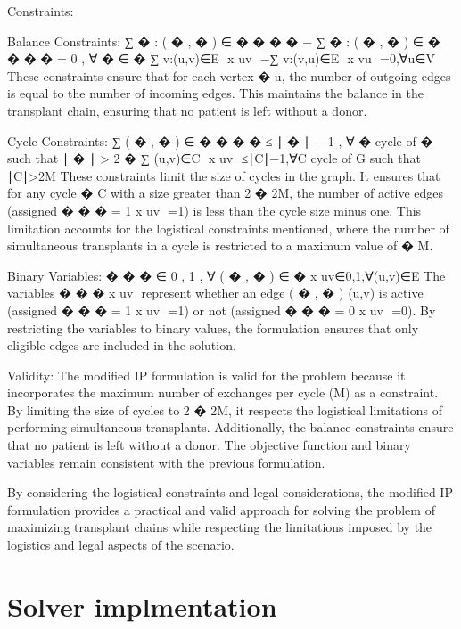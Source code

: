 \documentclass{ULBreport}
\begin{document}
Constraints:

Balance Constraints:
∑
�
:
(
�
,
�
)
∈
�
�
�
�
−
∑
�
:
(
�
,
�
)
∈
�
�
�
�
=
0
,
∀
�
∈
�
∑ 
v:(u,v)∈E
​
 x 
uv
​
 −∑ 
v:(v,u)∈E
​
 x 
vu
​
 =0,∀u∈V
These constraints ensure that for each vertex 
�
u, the number of outgoing edges is equal to the number of incoming edges. This maintains the balance in the transplant chain, ensuring that no patient is left without a donor.

Cycle Constraints:
∑
(
�
,
�
)
∈
�
�
�
�
≤
∣
�
∣
−
1
,
∀
�
 cycle of 
�
 such that 
∣
�
∣
>
2
�
∑ 
(u,v)∈C
​
 x 
uv
​
 ≤∣C∣−1,∀C cycle of G such that ∣C∣>2M
These constraints limit the size of cycles in the graph. It ensures that for any cycle 
�
C with a size greater than 
2
�
2M, the number of active edges (assigned 
�
�
�
=
1
x 
uv
​
 =1) is less than the cycle size minus one. This limitation accounts for the logistical constraints mentioned, where the number of simultaneous transplants in a cycle is restricted to a maximum value of 
�
M.

Binary Variables:
�
�
�
∈
{
0
,
1
}
,
∀
(
�
,
�
)
∈
�
x 
uv
​
 ∈{0,1},∀(u,v)∈E
The variables 
�
�
�
x 
uv
​
  represent whether an edge 
(
�
,
�
)
(u,v) is active (assigned 
�
�
�
=
1
x 
uv
​
 =1) or not (assigned 
�
�
�
=
0
x 
uv
​
 =0). By restricting the variables to binary values, the formulation ensures that only eligible edges are included in the solution.

Validity:
The modified IP formulation is valid for the problem because it incorporates the maximum number of exchanges per cycle (M) as a constraint. By limiting the size of cycles to 
2
�
2M, it respects the logistical limitations of performing simultaneous transplants. Additionally, the balance constraints ensure that no patient is left without a donor. The objective function and binary variables remain consistent with the previous formulation.

By considering the logistical constraints and legal considerations, the modified IP formulation provides a practical and valid approach for solving the problem of maximizing transplant chains while respecting the limitations imposed by the logistics and legal aspects of the scenario.
\section{Solver implmentation}
\nocite{*}
\printbibliography[type=article,title=Articles]
\end{document}
